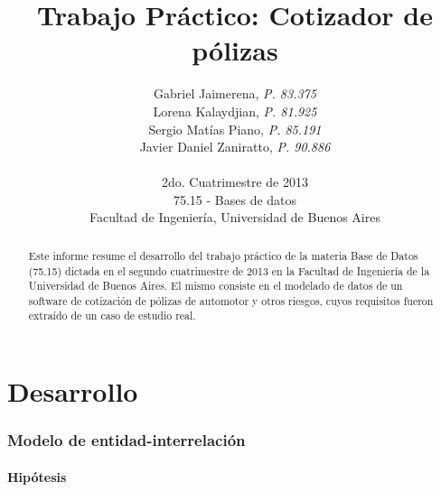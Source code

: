 \documentclass[a4paper,11pt]{article}
\title{\textbf{Trabajo Práctico: Cotizador de pólizas}}
\author{
  Gabriel Jaimerena,      \textit{P. 83.375}                      \\
  Lorena Kalaydjian,     \textit{P. 81.925}                      \\
  Sergio Matías Piano,     \textit{P. 85.191}                      \\
  Javier Daniel Zaniratto, \textit{P. 90.886}                      \\
  \\
  \normalsize{2do. Cuatrimestre de 2013}                           \\
  \normalsize{75.15 - Bases de datos}                              \\
  \normalsize{Facultad de Ingeniería, Universidad de Buenos Aires}
}
\date{}
\begin{document}
\thispagestyle{empty}
\maketitle

\begin{abstract}

  Este informe resume el desarrollo del trabajo práctico de la materia Base
  de Datos (75.15) dictada en el segundo cuatrimestre de 2013 en la Facultad de
  Ingeniería de la Universidad de Buenos Aires. El mismo consiste en el
  modelado de datos de un software de cotización de pólizas de automotor y otros riesgos,
  cuyos requisitos fueron extraído de un caso de estudio real.

\end{abstract}

\clearpage

\tableofcontents
\clearpage


\part{Desarrollo}


\section{Modelo de entidad-interrelación} \label{sec:der}

\subsection{Hipótesis}
\end{document}
